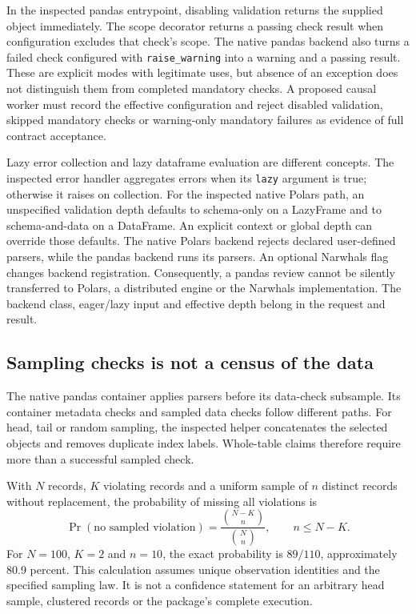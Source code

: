 In the inspected pandas entrypoint, disabling validation returns the supplied
object immediately. The scope decorator returns a passing check result when
configuration excludes that check's scope. The native pandas backend also
turns a failed check configured with \texttt{raise\_warning} into a warning
and a passing result. These are explicit modes with legitimate uses, but
absence of an exception does not distinguish them from completed mandatory
checks. A proposed causal worker must record the effective configuration and
reject disabled validation, skipped mandatory checks or warning-only mandatory
failures as evidence of full contract acceptance.~\citep{exec24_pandera_source}

Lazy error collection and lazy dataframe evaluation are different concepts.
The inspected error handler aggregates errors when its \texttt{lazy} argument
is true; otherwise it raises on collection. For the inspected native Polars
path, an unspecified validation depth defaults to schema-only on a LazyFrame
and to schema-and-data on a DataFrame. An explicit context or global depth
can override those defaults. The native Polars backend rejects declared
user-defined parsers, while the pandas backend runs its parsers. An optional
Narwhals flag changes backend registration. Consequently, a pandas review
cannot be silently transferred to Polars, a distributed engine or the
Narwhals implementation. The backend class, eager/lazy input and effective
depth belong in the request and result.~\citep{exec24_pandera_source}

\subsection{Sampling checks is not a census of the data}
The native pandas container applies parsers before its data-check subsample.
Its container metadata checks and sampled data checks follow different paths.
For head, tail or random sampling, the inspected helper concatenates the
selected objects and removes duplicate index labels. Whole-table claims
therefore require more than a successful sampled check.
\citep{exec24_pandera_source}

With $N$ records, $K$ violating records and a uniform sample of $n$ distinct
records without replacement, the probability of missing all violations is
\begin{equation}
 \Pr(\text{no sampled violation})=
 \frac{\binom{N-K}{n}}{\binom{N}{n}},\qquad n\leq N-K.
\end{equation}
For $N=100$, $K=2$ and $n=10$, the exact probability is $89/110$, approximately
80.9 percent. This calculation assumes unique observation identities and the
specified sampling law. It is not a confidence statement for an arbitrary
head sample, clustered records or the package's complete execution.
\citep{exec24_pandera_reference}

